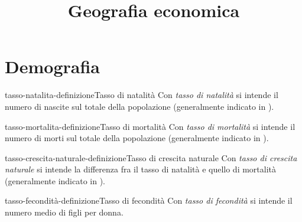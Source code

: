 \documentclass[preview]{standalone}
\begin{document}
\title{Geografia economica}
\genpage



\section{Demografia}

\begin{snippetdefinition}{tasso-natalita-definizione}{Tasso di natalità}
    Con \textit{tasso di natalità}
    si intende il numero di nascite sul totale della popolazione
    (generalmente indicato in \textperthousand).
\end{snippetdefinition}

\begin{snippetdefinition}{tasso-mortalita-definizione}{Tasso di mortalità}
    Con \textit{tasso di mortalità}
    si intende il numero di morti sul totale della popolazione
    (generalmente indicato in \textperthousand).
\end{snippetdefinition}

\begin{snippetdefinition}{tasso-crescita-naturale-definizione}{Tasso di crescita naturale}
    Con \textit{tasso di crescita naturale}
    si intende la differenza fra il tasso di natalità e quello di mortalità
    (generalmente indicato in \textperthousand).
\end{snippetdefinition}

\begin{snippetdefinition}{tasso-fecondità-definizione}{Tasso di fecondità}
    Con \textit{tasso di fecondità}
    si intende il numero medio di figli per donna.
\end{snippetdefinition}
\end{document}
